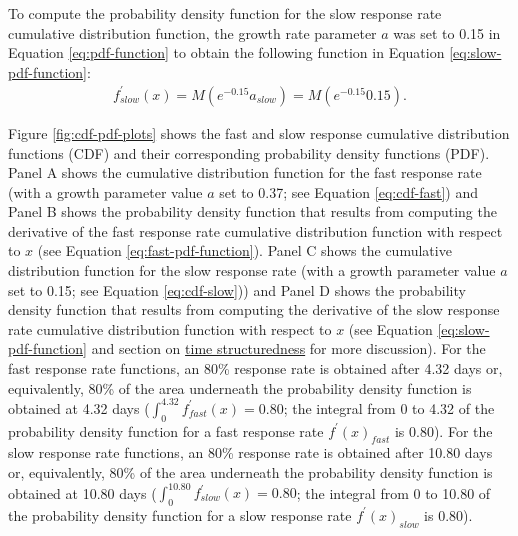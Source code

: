 \documentclass[
12pt, %
twoside,
english]{guelphthesis}
\begin{document}
\noindent To compute the probability density function for the slow
response rate cumulative distribution function, the growth rate
parameter \(a\) was set to 0.15 in Equation \ref{eq:pdf-function} to
obtain the following function in Equation \ref{eq:slow-pdf-function}:
\begin{align}
f^\prime_{slow}(x) = M (e^{-0.15}a_{slow}) = M (e^{-0.15}0.15). 
\label{eq:slow-pdf-function}
\end {align}

Figure \ref{fig:cdf-pdf-plots} shows the fast and slow response
cumulative distribution functions (CDF) and their corresponding
probability density functions (PDF). Panel A shows the cumulative
distribution function for the fast response rate (with a growth
parameter value \(a\) set to 0.37; see Equation \ref{eq:cdf-fast}) and
Panel B shows the probability density function that results from
computing the derivative of the fast response rate cumulative
distribution function with respect to \(x\) (see Equation
\ref{eq:fast-pdf-function}). Panel C shows the cumulative distribution
function for the slow response rate (with a growth parameter value \(a\)
set to 0.15; see Equation \ref{eq:cdf-slow})) and Panel D shows the
probability density function that results from computing the derivative
of the slow response rate cumulative distribution function with respect
to \(x\) (see Equation \ref{eq:slow-pdf-function} and section on \protect\hyperlink{sec:time-structuredness}{time
structuredness} for more discussion). For the
fast response rate functions, an 80\% response rate is obtained after
4.32 days or, equivalently, 80\% of the area underneath the probability
density function is obtained at 4.32 days
(\(\int^{4.32}_{0} f_{fast}^\prime (x) = 0.80\); the integral from 0 to 4.32 of the probability density function for a fast response rate \(f^\prime(x)_{fast}\) is 0.80). For the slow response
rate functions, an 80\% response rate is obtained after 10.80 days or,
equivalently, 80\% of the area underneath the probability density
function is obtained at 10.80 days
(\(\int^{10.80}_{0} f_{slow}^\prime (x) = 0.80\); the integral from 0 to 10.80 of the probability density function for a slow response rate \(f^\prime(x)_{slow}\) is 0.80).
\end{document}
